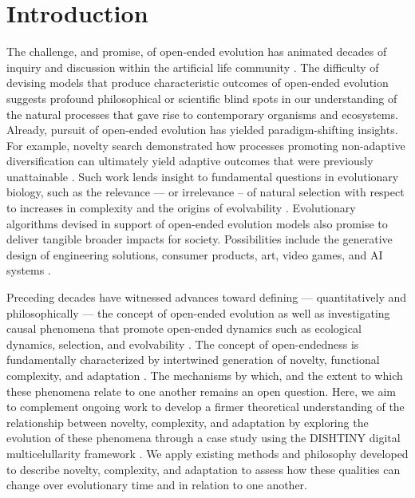 \section{Introduction}

The challenge, and promise, of open-ended evolution has animated decades of inquiry and discussion within the artificial life community \citep{packard2019overview}.
The difficulty of devising models that produce characteristic outcomes of open-ended evolution suggests profound philosophical or scientific blind spots in our understanding of the natural processes that gave rise to contemporary organisms and ecosystems.
Already, pursuit of open-ended evolution has yielded paradigm-shifting insights.
For example, novelty search demonstrated how processes promoting non-adaptive diversification can ultimately yield adaptive outcomes that were previously unattainable \citep{lehman2011abandoning}. 
Such work lends insight to fundamental questions in evolutionary biology, such as the relevance — or irrelevance – of natural selection with respect to increases in complexity \citep{lehman2012evolution, Lynch8597} and the origins of evolvability \citep{lehman2013evolvability,Kirschner8420}.
Evolutionary algorithms devised in support of open-ended evolution models also promise to deliver tangible broader impacts for society.
Possibilities include the generative design of engineering solutions, consumer products, art, video games, and AI systems \citep{nguyen2015,stanley2017open}.

Preceding decades have witnessed advances toward defining — quantitatively and philosophically — the concept of open-ended evolution \citep{lehman2012beyond,dolson2019modes,bedau1998classification} as well as investigating causal phenomena that promote open-ended dynamics such as ecological dynamics, selection, and evolvability \citep{dolson2019constructive,soros2014identifying,huizinga2018emergence}.
The concept of open-endedness is fundamentally characterized by intertwined generation of novelty, functional complexity, and adaptation \citep{taylor2016open}.
The mechanisms by which, and the extent to which these phenomena relate to one another remains an open question.
Here, we aim to complement ongoing work to develop a firmer theoretical understanding of the relationship between novelty, complexity, and adaptation by exploring the evolution of these phenomena through a case study using the DISHTINY digital multicelullarity framework \citep{moreno2019toward}.
We apply existing methods and philosophy developed to describe novelty, complexity, and adaptation to assess how these qualities can change over evolutionary time and in relation to one another.